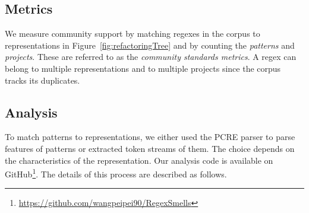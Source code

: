 \subsection{Metrics}
\label{sec:communitymetric}
We measure community support by matching regexes in the corpus to representations in Figure~\ref{fig:refactoringTree} and by counting the \emph{patterns} and \emph{projects}. These are referred to as the \emph{community standards metrics}.
A regex can belong to multiple representations and to multiple projects since the corpus tracks its duplicates.

%
%






\subsection{Analysis}
\label{communityanalysis}
To match patterns to representations, we either used the PCRE parser to parse features of patterns or extracted token streams of them. The choice depends on the characteristics of the representation. Our analysis code is available on GitHub\footnote{\url{https://github.com/wangpeipei90/RegexSmells}}. 
The details of this process are described as follows.

